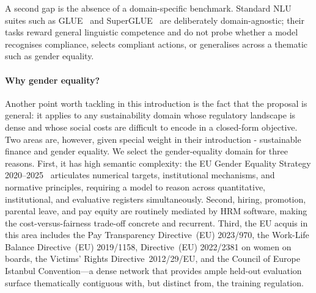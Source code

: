 \documentclass[pdflatex, sn-apa]{sn-jnl}%
\theoremstyle{thmstyleone}%
\theoremstyle{thmstyletwo}%
\theoremstyle{thmstylethree}%
\begin{document}
A second gap is the absence of a domain-specific benchmark. Standard NLU suites
such as GLUE~\citep{wang2018glue} and SuperGLUE~\citep{wang2019superglue} are
deliberately domain-agnostic; their tasks reward general linguistic competence
and do not probe whether a model recognises compliance, selects compliant
actions, or generalises across a thematic such as gender equality.

\paragraph{Why gender equality?}
Another point worth tackling in this introduction is the fact that the proposal
is general: it applies to any sustainability domain whose regulatory landscape
is dense and whose social costs are difficult to encode in a closed-form
objective. Two areas are, however, given special weight in their introduction -
sustainable finance and gender equality. We select the gender-equality domain
for three reasons. First, it has high semantic complexity: the EU Gender
Equality Strategy 2020--2025~\citep{europeancommission2020strategy} articulates
numerical targets, institutional mechanisms, and normative principles, requiring
a model to reason across quantitative, institutional, and evaluative registers
simultaneously. Second, hiring, promotion, parental leave, and pay equity are
routinely mediated by HRM software, making the cost-versus-fairness trade-off
concrete and recurrent. Third, the EU acquis in
this area includes the Pay Transparency Directive~(EU) 2023/970, the Work-Life
Balance Directive~(EU) 2019/1158, Directive~(EU) 2022/2381 on women on boards,
the Victims' Rights Directive~2012/29/EU, and the Council of Europe Istanbul
Convention---a dense network that provides ample held-out evaluation surface
thematically contiguous with, but distinct from, the training regulation.
 
\end{document}
